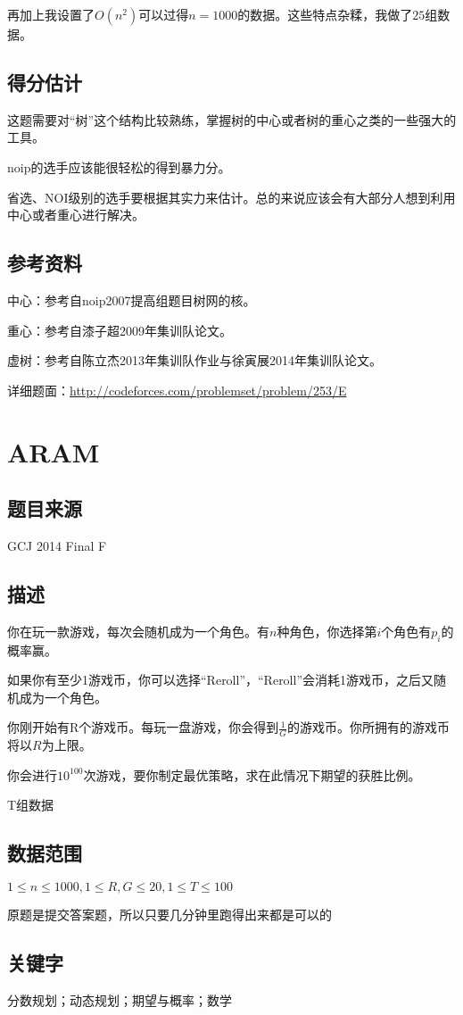 \documentclass{ctexart}
\begin{document}
			再加上我设置了$O(n^2)$可以过得$n=1000$的数据。这些特点杂糅，我做了$25$组数据。
		\subsection{得分估计}
			这题需要对``树''这个结构比较熟练，掌握树的中心或者树的重心之类的一些强大的工具。

			noip的选手应该能很轻松的得到暴力分。

			省选、NOI级别的选手要根据其实力来估计。总的来说应该会有大部分人想到利用中心或者重心进行解决。
		\subsection{参考资料}
			中心：参考自noip2007提高组题目树网的核。

			重心：参考自漆子超2009年集训队论文。

			虚树：参考自陈立杰2013年集训队作业与徐寅展2014年集训队论文。

			详细题面：\href{http://codeforces.com/problemset/problem/348/E}{http://codeforces.com/problemset/problem/253/E}
	\newpage
	\section{ARAM}
		\subsection{题目来源}
			GCJ 2014 Final F
		\subsection{描述}
			你在玩一款游戏，每次会随机成为一个角色。有$n$种角色，你选择第$i$个角色有$p_i$的概率赢。

			如果你有至少1游戏币，你可以选择“Reroll”，“Reroll”会消耗1游戏币，之后又随机成为一个角色。

			你刚开始有R个游戏币。每玩一盘游戏，你会得到$\frac{1}{G}$的游戏币。你所拥有的游戏币将以$R$为上限。

			你会进行$10^{100}$次游戏，要你制定最优策略，求在此情况下期望的获胜比例。

			T组数据
		\subsection{数据范围}
			$1 \le n \le 1000,1 \le R,G \le 20,1 \le T \le 100$

			原题是提交答案题，所以只要几分钟里跑得出来都是可以的
		\subsection{关键字}
			分数规划；动态规划；期望与概率；数学
\end{document}
